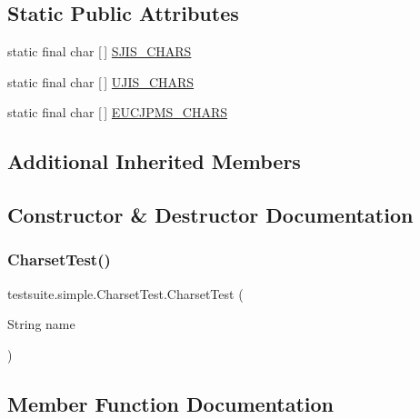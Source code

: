 \subsection*{Static Public Attributes}
\begin{DoxyCompactItemize}
\item 
static final char \mbox{[}$\,$\mbox{]} \mbox{\hyperlink{classtestsuite_1_1simple_1_1_charset_test_aea9e321b4ce55b3fe366d39ac69da267}{S\+J\+I\+S\+\_\+\+C\+H\+A\+RS}}
\item 
static final char \mbox{[}$\,$\mbox{]} \mbox{\hyperlink{classtestsuite_1_1simple_1_1_charset_test_afdb55a8c00071fb31c3b37c660d8ba3c}{U\+J\+I\+S\+\_\+\+C\+H\+A\+RS}}
\item 
static final char \mbox{[}$\,$\mbox{]} \mbox{\hyperlink{classtestsuite_1_1simple_1_1_charset_test_aa9c89e77068a2f7b4361d9dd6b00f5ac}{E\+U\+C\+J\+P\+M\+S\+\_\+\+C\+H\+A\+RS}}
\end{DoxyCompactItemize}
\subsection*{Additional Inherited Members}


\subsection{Constructor \& Destructor Documentation}
\mbox{\label{classtestsuite_1_1simple_1_1_charset_test_a6c41126f4f1e57b55d853cf3d7c55155}} 
\subsubsection{\texorpdfstring{Charset\+Test()}{CharsetTest()}}
{\footnotesize\ttfamily testsuite.\+simple.\+Charset\+Test.\+Charset\+Test (\begin{DoxyParamCaption}\item[{String}]{name }\end{DoxyParamCaption})}



\subsection{Member Function Documentation}
\mbox{\label{classtestsuite_1_1simple_1_1_charset_test_a3413e56bcb53af4a9f65a650fb408b47}} 
